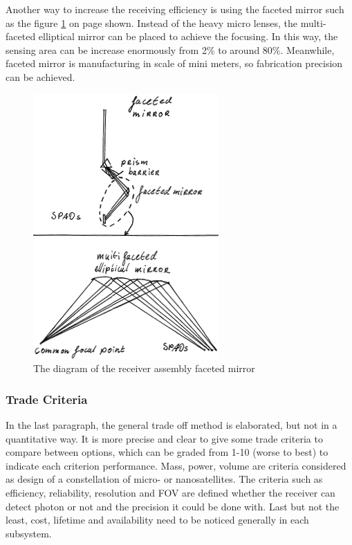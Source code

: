 Another way to increase the receiving efficiency is using the faceted mirror such as the figure \ref{fig:diagram_Rfaceted mirror} on page \pageref{fig:diagram_Rfaceted mirror} shown. Instead of the heavy micro lenses, the multi-faceted elliptical mirror can be placed to achieve the focusing. In this way, the sensing area can be increase enormously from 2\% to around 80\%. Meanwhile, faceted mirror is manufacturing in scale of mini meters, so fabrication precision can be achieved.

\begin{figure}[ht!]
\centering
\includegraphics[scale = 0.6]{chapters/img/DiagramReceiverAssemblyFacetedMirror.png}
\caption{The diagram of the receiver assembly faceted mirror}
\label{fig:diagram_Rfaceted mirror}
\end{figure}

\subsubsection{Trade Criteria}
\label{TOReceiverC}
In the last paragraph, the general trade off method is elaborated, but not in a quantitative way. It is more precise and clear to give some trade criteria to compare between options, which can be graded from 1-10 (worse to best) to indicate each criterion performance. Mass, power, volume are criteria considered as design of a constellation of micro- or nanosatellites. The criteria such as efficiency, reliability, resolution and \ac{FOV} are defined whether the receiver can detect photon or not and the precision it could be done with. Last but not the least, cost, lifetime and availability need to be noticed generally in each subsystem.

